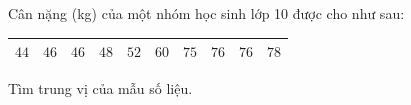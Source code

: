 \begin{ex}
Cân nặng (kg) của một nhóm học sinh lớp 10 được cho như sau:
\begin{center}
\begin{tabular}{|c|c|c|c|c|c|c|c|c|c|}\hline
$44$ & $46$ & $46$ & $48$ & $52$ & $60$ & $75$ & $76$ & $76$ & $78$\\\hline
\end{tabular}
\end{center}
Tìm trung vị của mẫu số liệu.
\end{ex}
